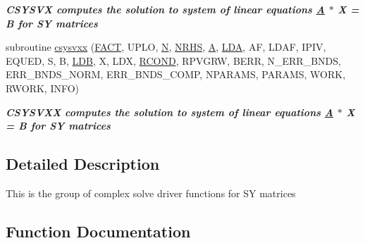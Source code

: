 \begin{DoxyCompactItemize}
\begin{DoxyCompactList}\small\item\em {\bfseries  C\+S\+Y\+S\+V\+X computes the solution to system of linear equations \hyperlink{classA}{A} $\ast$ X = B for S\+Y matrices} \end{DoxyCompactList}\item 
subroutine \hyperlink{group__complexSYsolve_ga48da16f71d9aa75098b8c6d3c4007979}{csysvxx} (\hyperlink{superlu__enum__consts_8h_af00a42ecad444bbda75cde1b64bd7e72a1b6692b56d378abb85bd49063721d034}{F\+A\+C\+T}, U\+P\+L\+O, \hyperlink{polmisc_8c_a0240ac851181b84ac374872dc5434ee4}{N}, \hyperlink{example__user_8c_aa0138da002ce2a90360df2f521eb3198}{N\+R\+H\+S}, \hyperlink{classA}{A}, \hyperlink{example__user_8c_ae946da542ce0db94dced19b2ecefd1aa}{L\+D\+A}, A\+F, L\+D\+A\+F, I\+P\+I\+V, E\+Q\+U\+E\+D, S, B, \hyperlink{example__user_8c_a50e90a7104df172b5a89a06c47fcca04}{L\+D\+B}, X, L\+D\+X, \hyperlink{superlu__enum__consts_8h_af00a42ecad444bbda75cde1b64bd7e72a9b5c151728d8512307565994c89919d5}{R\+C\+O\+N\+D}, R\+P\+V\+G\+R\+W, B\+E\+R\+R, N\+\_\+\+E\+R\+R\+\_\+\+B\+N\+D\+S, E\+R\+R\+\_\+\+B\+N\+D\+S\+\_\+\+N\+O\+R\+M, E\+R\+R\+\_\+\+B\+N\+D\+S\+\_\+\+C\+O\+M\+P, N\+P\+A\+R\+A\+M\+S, P\+A\+R\+A\+M\+S, W\+O\+R\+K, R\+W\+O\+R\+K, I\+N\+F\+O)
\begin{DoxyCompactList}\small\item\em {\bfseries  C\+S\+Y\+S\+V\+X\+X computes the solution to system of linear equations \hyperlink{classA}{A} $\ast$ X = B for S\+Y matrices} \end{DoxyCompactList}\end{DoxyCompactItemize}


\subsection{Detailed Description}
This is the group of complex solve driver functions for S\+Y matrices 

\subsection{Function Documentation}
\hypertarget{group__complexSYsolve_ga7bfdf654eb5b41b318d5b8b3be55f575}{}
